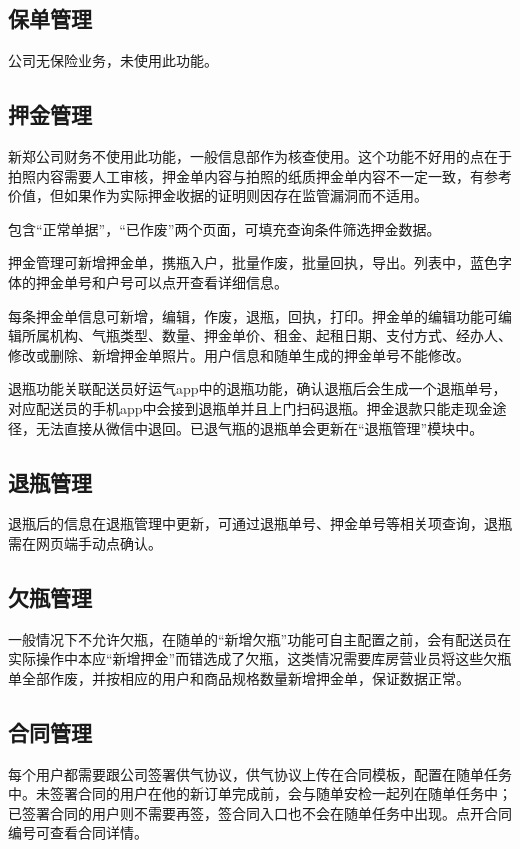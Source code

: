 \documentclass[UTF8]{ctexart}
\begin{document}
\subsection{保单管理}
公司无保险业务，未使用此功能。

\subsection{押金管理}
新郑公司财务不使用此功能，一般信息部作为核查使用。这个功能不好用的点在于拍照内容需要人工审核，押金单内容与拍照的纸质押金单内容不一定一致，有参考价值，但如果作为实际押金收据的证明则因存在监管漏洞而不适用。

包含“正常单据”，“已作废”两个页面，可填充查询条件筛选押金数据。

押金管理可新增押金单，携瓶入户，批量作废，批量回执，导出。列表中，蓝色字体的押金单号和户号可以点开查看详细信息。

每条押金单信息可新增，编辑，作废，退瓶，回执，打印。押金单的编辑功能可编辑所属机构、气瓶类型、数量、押金单价、租金、起租日期、支付方式、经办人、修改或删除、新增押金单照片。用户信息和随单生成的押金单号不能修改。

退瓶功能关联配送员好运气app中的退瓶功能，确认退瓶后会生成一个退瓶单号，对应配送员的手机app中会接到退瓶单并且上门扫码退瓶。押金退款只能走现金途径，无法直接从微信中退回。已退气瓶的退瓶单会更新在“退瓶管理”模块中。

\subsection{退瓶管理}

退瓶后的信息在退瓶管理中更新，可通过退瓶单号、押金单号等相关项查询，退瓶需在网页端手动点确认。

\subsection{欠瓶管理}

一般情况下不允许欠瓶，在随单的“新增欠瓶”功能可自主配置之前，会有配送员在实际操作中本应“新增押金”而错选成了欠瓶，这类情况需要库房营业员将这些欠瓶单全部作废，并按相应的用户和商品规格数量新增押金单，保证数据正常。

\subsection{合同管理}

每个用户都需要跟公司签署供气协议，供气协议上传在合同模板，配置在随单任务中。未签署合同的用户在他的新订单完成前，会与随单安检一起列在随单任务中；已签署合同的用户则不需要再签，签合同入口也不会在随单任务中出现。点开合同编号可查看合同详情。
\end{document}
